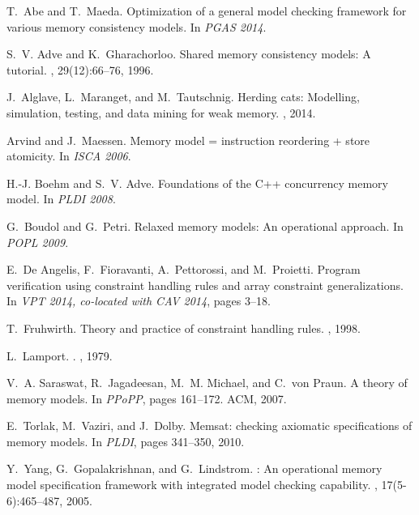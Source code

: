\documentclass[EPiC]{easychair}
\begin{document}
\begin{thebibliography}{10}

T.~Abe and T.~Maeda.
\newblock Optimization of a general model checking framework for various memory
  consistency models.
\newblock In {\em PGAS 2014}.

S.~V. Adve and K.~Gharachorloo.
\newblock Shared memory consistency models: A tutorial.
, 29(12):66--76, 1996.

J.~Alglave, L.~Maranget, and M.~Tautschnig.
\newblock Herding cats: Modelling, simulation, testing, and data mining for
  weak memory.
, 2014.

Arvind and J.~Maessen.
\newblock Memory model = instruction reordering + store atomicity.
\newblock In {\em ISCA 2006}.

H.-J. Boehm and S.~V. Adve.
\newblock Foundations of the {C}++ concurrency memory model.
\newblock In {\em PLDI 2008}.

G.~Boudol and G.~Petri.
\newblock Relaxed memory models: An operational approach.
\newblock In {\em POPL 2009}.

E.~{De Angelis}, F.~Fioravanti, A.~Pettorossi, and M.~Proietti.
\newblock Program verification using constraint handling rules and array
  constraint generalizations.
\newblock In {\em {VPT} 2014, co-located with {CAV} 2014}, pages 3--18.

T.~Fruhwirth.
\newblock Theory and practice of constraint handling rules.
, 1998.

L.~Lamport.
.
, 1979.

V.~A. Saraswat, R.~Jagadeesan, M.~M. Michael, and C.~von Praun.
\newblock A theory of memory models.
\newblock In {\em PPoPP}, pages 161--172. {ACM}, 2007.

E.~Torlak, M.~Vaziri, and J.~Dolby.
\newblock Memsat: checking axiomatic specifications of memory models.
\newblock In {\em PLDI}, pages 341--350, 2010.

Y.~Yang, G.~Gopalakrishnan, and G.~Lindstrom.
: An operational memory model specification framework with
  integrated model checking capability.
, 17(5-6):465--487, 2005.

\end{thebibliography}





\end{document}
